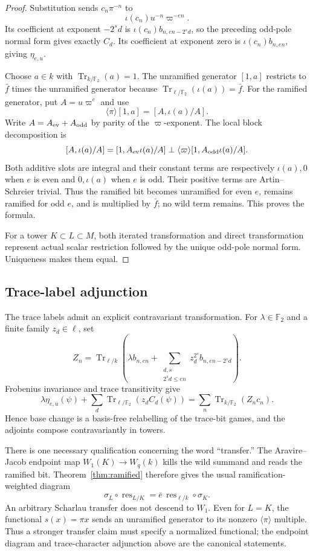 \documentclass[11pt]{article}
\theoremstyle{definition}
\theoremstyle{remark}
\newcommand{\F}{\mathbb{F}}
\newcommand{\Tr}{\operatorname{Tr}}
\begin{document}
\begin{proof}
Substitution sends $c_n\pi^{-n}$ to
\[
\iota(c_n)u^{-n}\varpi^{-en}.
\]
Its coefficient at exponent $-2^sd$ is
$\iota(c_n)b_{n,en-2^sd}$, so the preceding odd-pole normal form gives exactly
$C_d$.  Its coefficient at exponent zero is
$\iota(c_n)b_{n,en}$, giving $\eta_{e,u}$.

Choose $a\in k$ with $\Tr_{k/\F_2}(a)=1$.  The unramified generator
$[1,a]$ restricts to $\bar f$ times the unramified generator because
$\Tr_{\ell/\F_2}(\iota(a))=\bar f$.  For the ramified generator, put
$A=u\varpi^e$ and use
\[
\langle\pi\rangle[1,a]=[A,\iota(a)/A].
\]
Write $A=A_{\rm ev}+A_{\rm odd}$ by parity of the $\varpi$-exponent.  The
local block decomposition is
\[
[A,\iota(a)/A]
= [1,A_{\rm ev}\iota(a)/A]
 \perp\langle\varpi\rangle
    [1,A_{\rm odd}\iota(a)/A].
\]
Both additive slots are integral and their constant terms are respectively
$\iota(a),0$ when $e$ is even and $0,\iota(a)$ when $e$ is odd.  Their
positive terms are Artin--Schreier trivial.  Thus the ramified bit becomes
unramified for even $e$, remains ramified for odd $e$, and is multiplied by
$\bar f$; no wild term remains.  This proves the formula.

For a tower $K\subset L\subset M$, both iterated transformation and direct
transformation represent actual scalar restriction followed by the unique
odd-pole normal form.  Uniqueness makes them equal.
\end{proof}

\subsection{Trace-label adjunction}

The trace labels admit an explicit contravariant transformation.  For
$\lambda\in\F_2$ and a finite family $z_d\in\ell$, set
\[
Z_n=\Tr_{\ell/k}\left(
 \lambda b_{n,en}+
 \sum_{\substack{d,s\\2^sd\le en}}
 z_d^{2^s}b_{n,en-2^sd}
\right).
\]
Frobenius invariance and trace transitivity give
\[
\lambda\eta_{e,u}(\psi)+
 \sum_d\Tr_{\ell/\F_2}(z_dC_d(\psi))
=\sum_n\Tr_{k/\F_2}(Z_nc_n).
\]
Hence base change is a basis-free relabelling of the trace-bit games, and the
adjoints compose contravariantly in towers.

There is one necessary qualification concerning the word ``transfer.''  The
Aravire--Jacob endpoint map $W_1(K)\to W_q(k)$ kills the wild summand and reads
the ramified bit.  Theorem~\ref{thm:ramified} therefore gives the usual
ramification-weighted diagram
\[
 \sigma_L\circ\operatorname{res}_{L/K}
 =\bar e\,\operatorname{res}_{\ell/k}\circ\sigma_K.
\]
An arbitrary Scharlau transfer does not descend to $W_1$.  Even for $L=K$,
the functional $s(x)=\pi x$ sends an unramified generator to its nonzero
$\langle\pi\rangle$ multiple.  Thus a stronger transfer claim must specify a
normalized functional; the endpoint diagram and trace-character adjunction
above are the canonical statements.
\end{document}
